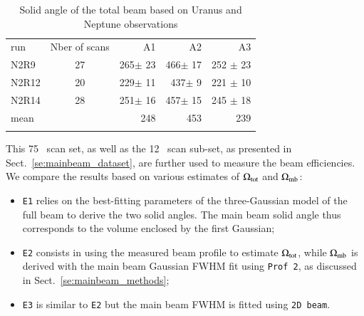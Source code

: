 \begin{table}[!h]
\caption{Solid angle of the total beam based on Uranus and Neptune observations}
\label{tab:solid}
\centering
\begin{tabular}{l c rrr}
\hline\hline
\noalign{\smallskip}
run  & Nber of scans & %
A1    &    A2   &  A3  \\%
\noalign{\smallskip}
\hline
\noalign{\smallskip}
N2R9    & 27  &  265$\pm$ 23    &  466$\pm$ 17 & 252 $\pm$ 23 \\%
N2R12   & 20  &  229$\pm$ 11    &  437$\pm$  9 & 221 $\pm$ 10 \\%
N2R14   & 28  &  251$\pm$ 16    &  457$\pm$ 15 & 245 $\pm$ 18 \\%
mean    &     &  248            &  453         &  239         \\%
\noalign{\smallskip}
\hline
\end{tabular}
\end{table}


This 75 \bm\ scan set, as well as the 12 \bm\ scan sub-set, as
presented in Sect.~\ref{se:mainbeam_dataset}, are further used to
measure the beam
efficiencies. We compare the results based on various estimates of
$\Omega_{\rm{tot}}$ and $\Omega_{\rm{mb}}$:
\begin{itemize}
  \item{{\tt E1} relies on the best-fitting parameters of the
    three-Gaussian model of the full beam to derive the two solid
    angles. The main beam solid angle thus corresponds to the volume
    enclosed by the first Gaussian;}
  \item{{\tt E2} consists in using the measured beam profile to
    estimate $\Omega_{\rm{tot}}$, while $\Omega_{\rm{mb}}$ is derived
    with the main beam Gaussian FWHM fit using {\tt Prof 2}, as discussed in Sect.~\ref{se:mainbeam_methods};}
  \item{{\tt E3} is similar to {\tt E2} but the main beam FWHM is
    fitted using {\tt 2D beam}.}  
\end{itemize}

